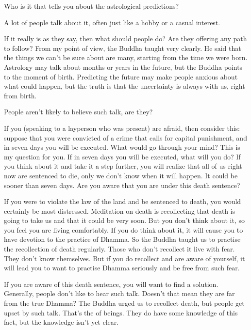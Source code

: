 Who is it that tells you about the astrological predictions?

 A lot of people talk about it, often just like a hobby or a casual interest.

 If it really is as they say, then what should people do? Are they offering any path to follow? From my point of view, the Buddha taught very clearly. He said that the things we can't be sure about are many, starting from the time we were born. Astrology may talk about months or years in the future, but the Buddha points to the moment of birth. Predicting the future may make people anxious about what could happen, but the truth is that the uncertainty is always with us, right from birth.

People aren't likely to believe such talk, are they?

If you (speaking to a layperson who was present) are afraid, then consider this: suppose that you were convicted of a crime that calls for capital punishment, and in seven days you will be executed. What would go through your mind? This is my question for you. If in seven days you will be executed, what will you do? If you think about it and take it a step further, you will realize that all of us right now are sentenced to die, only we don't know when it will happen. It could be sooner than seven days. Are you aware that you are under this death sentence?

If you were to violate the law of the land and be sentenced to death, you would certainly be most distressed. Meditation on death is recollecting that death is going to take us and that it could be very soon. But you don't think about it, so you feel you are living comfortably. If you do think about it, it will cause you to have devotion to the practice of Dhamma. So the Buddha taught us to practise the recollection of death regularly. Those who don't recollect it live with fear. They don't know themselves. But if you do recollect and are aware of yourself, it will lead you to want to practise Dhamma seriously and be free from such fear.

If you are aware of this death sentence, you will want to find a solution. Generally, people don't like to hear such talk. Doesn't that mean they are far from the true Dhamma? The Buddha urged us to recollect death, but people get upset by such talk. That's the  of beings. They do have some knowledge of this fact, but the knowledge isn't yet clear.

